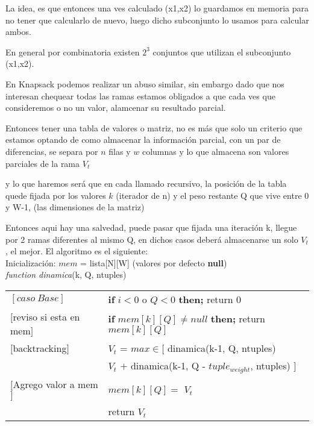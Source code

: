 \documentclass[fleqn, 11pt]{article}
\begin{document}
La idea, es que entonces una ves calculado (x1,x2) lo guardamos en memoria para no tener que calcularlo de nuevo,
luego dicho subconjunto lo usamos para calcular ambos.

En general por combinatoria existen $2^3$ conjuntos que utilizan el subconjunto (x1,x2).

En Knapsack podemos realizar un abuso similar, sin embargo dado que nos interesan chequear todas las ramas estamos
obligados a que cada ves que consideremos o no un valor, alamcenar su resultado parcial.

Entonces tener una tabla de valores o matriz, no es más que solo un criterio que estamos optando de como almacenar
la información parcial, con un par de diferencias, se separa por $n$ filas y $w$ columnas y lo que almacena
son valores parciales de la rama \textit{$V_t$}

y lo que haremos será que en cada llamado recursivo, la posición de la tabla quede fijada por los valores $k$
(iterador de n) y el peso restante Q que vive entre 0 y W-1, (las dimensiones de la matriz)

Entonces aqui hay una salvedad, puede pasar que fijada una iteración k, llegue por 2 ramas diferentes al mismo Q,
en dichos casos deberá almacenarse un solo \textit{$V_t$}, el mejor. El algoritmo es el siguiente: \\

Inicialización: \quad \textit{$mem$} \quad = lista[N][W] (valores por defecto \textbf{null}) \\

\textit{function \quad dinamica}(k, Q, ntuples)


\begin{tabular}{l l}
    $[caso\ Base]$ & \textbf{if}  $i  <  0$ o  $Q  <  0$ \textbf{then;} return 0   \\
    $[$reviso si esta en mem$]$ & \textbf{if}  $mem[k][Q] \neq null$  \textbf{then;} return $mem[k][Q]$ \\
    $[$backtracking$]$ & \textit{$V_t$} = $ max \in  [ $  dinamica(k-1, Q, ntuples)  \\
    & \hspace{30pt} \textit{$V_t$} $ + $ dinamica(k-1, Q - $tuple_{weight}$, ntuples) $ ] $ \\
    $[$Agrego valor a mem$]$ &   $mem[k][Q] = $ \textit{$V_t$} \\
    & return \textit{$V_t$}

\end{tabular}
\end{document}
